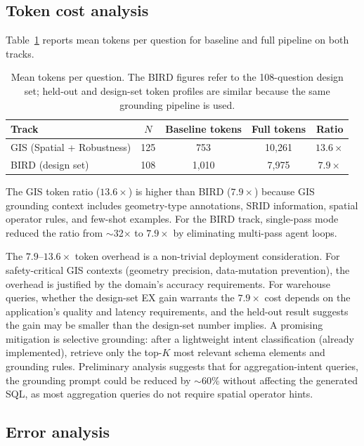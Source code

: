 \documentclass[11pt]{article}
\begin{document}
\subsection{Token cost analysis}
\label{sec:tokens}

Table~\ref{tab:tokens} reports mean tokens per question for baseline and full pipeline on both tracks.

\begin{table}[t]
\centering
\caption{Mean tokens per question. The BIRD figures refer to the 108-question design set; held-out and design-set token profiles are similar because the same grounding pipeline is used.}
\label{tab:tokens}
\begin{tabular}{lcccc}
\toprule
Track & $N$ & Baseline tokens & Full tokens & Ratio \\
\midrule
GIS (Spatial + Robustness)  & 125        & 753   & 10{,}261 & $13.6\times$ \\
BIRD (design set)           & 108        & 1{,}010 & 7{,}975 & $7.9\times$ \\
\bottomrule
\end{tabular}
\end{table}

The GIS token ratio ($13.6\times$) is higher than BIRD ($7.9\times$) because GIS grounding context includes geometry-type annotations, SRID information, spatial operator rules, and few-shot examples. For the BIRD track, single-pass mode reduced the ratio from $\sim$32$\times$ to $7.9\times$ by eliminating multi-pass agent loops.

The $7.9$--$13.6\times$ token overhead is a non-trivial deployment consideration. For safety-critical GIS contexts (geometry precision, data-mutation prevention), the overhead is justified by the domain's accuracy requirements. For warehouse queries, whether the design-set EX gain warrants the $7.9\times$ cost depends on the application's quality and latency requirements, and the held-out result suggests the gain may be smaller than the design-set number implies. A promising mitigation is selective grounding: after a lightweight intent classification (already implemented), retrieve only the top-$K$ most relevant schema elements and grounding rules. Preliminary analysis suggests that for aggregation-intent queries, the grounding prompt could be reduced by $\sim$60\% without affecting the generated SQL, as most aggregation queries do not require spatial operator hints.

\subsection{Error analysis}
\label{sec:error}
\end{document}

